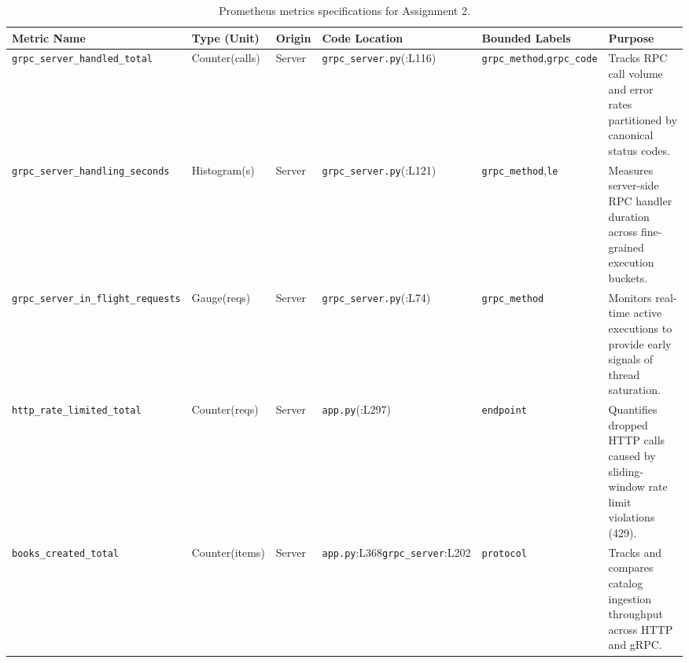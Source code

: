 \documentclass[11pt,a4paper]{article}
\begin{document}
\begin{table}[htbp]
\centering
\small
\renewcommand{\arraystretch}{1.3}
\begin{tabularx}{\textwidth}{p{3.2cm} p{1.8cm} p{1.1cm} p{2.4cm} p{2.2cm} X}
\toprule
\textbf{Metric Name} & \textbf{Type (Unit)} & \textbf{Origin} & \textbf{Code Location} & \textbf{Bounded Labels} & \textbf{Purpose} \\
\midrule
\texttt{grpc\_server\_}\newline\texttt{handled\_total} & Counter\newline(calls) & Server & \texttt{grpc\_server.py}\newline\footnotesize(:L116) & \texttt{grpc\_method},\newline\texttt{grpc\_code} & Tracks RPC call volume and error rates partitioned by canonical status codes. \\
\texttt{grpc\_server\_}\newline\texttt{handling\_seconds} & Histogram\newline(s) & Server & \texttt{grpc\_server.py}\newline\footnotesize(:L121) & \texttt{grpc\_method},\newline\texttt{le} & Measures server-side RPC handler duration across fine-grained execution buckets. \\
\texttt{grpc\_server\_}\newline\texttt{in\_flight\_requests} & Gauge\newline(reqs) & Server & \texttt{grpc\_server.py}\newline\footnotesize(:L74) & \texttt{grpc\_method} & Monitors real-time active executions to provide early signals of thread saturation. \\
\texttt{http\_rate\_}\newline\texttt{limited\_total} & Counter\newline(reqs) & Server & \texttt{app.py}\newline\footnotesize(:L297) & \texttt{endpoint} & Quantifies dropped HTTP calls caused by sliding-window rate limit violations (429). \\
\texttt{books\_created\_total} & Counter\newline(items) & Server & \texttt{app.py}:L368\newline\texttt{grpc\_server}:L202 & \texttt{protocol} & Tracks and compares catalog ingestion throughput across HTTP and gRPC. \\
\bottomrule
\end{tabularx}
\caption{Prometheus metrics specifications for Assignment 2.}
\label{tab:metric_specs}
\end{table}
\end{document}

